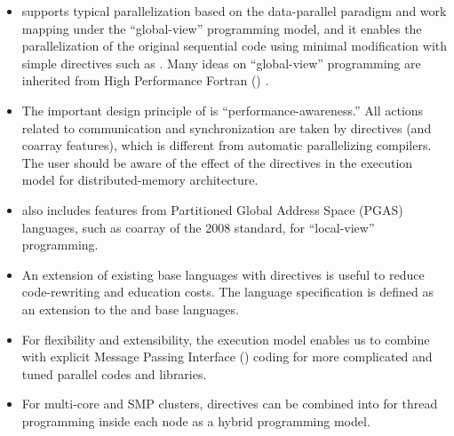 \begin{itemize}

 \item {\XMP} supports typical parallelization based on the
       data-parallel paradigm and work mapping under the ``global-view''
       programming model, and it enables the parallelization of the
       original sequential code using minimal modification with simple
       directives such as {\OMP} \cite{omp}. Many ideas on ``global-view''
       programming are inherited from High Performance Fortran ({\HPF})
       \cite{hpf}.

 \item The important design principle of {\XMP} is
       ``performance-awareness.'' All actions related to communication
       and synchronization are taken by directives (and coarray features),
       which is different from automatic parallelizing compilers. The
       user should be aware of the effect of the {\XMP} directives in
       the execution model for distributed-memory architecture.

 \item {\XMP} also includes features from Partitioned Global Address
       Space (PGAS) languages, such as coarray of the {\Fort} 2008
       standard, for ``local-view'' programming.

 \item An extension of existing base languages with directives is useful
       to reduce code-rewriting and education costs. The {\XMP} language
       specification is defined as an extension to the {\Fort} and {\C}
       base languages.

 \item For flexibility and extensibility, the execution model enables us
       to combine {\XMP} with explicit Message Passing Interface ({\MPI})
       \cite{mpi} coding for more complicated and tuned parallel codes
       and libraries.

 \item For multi-core and SMP clusters, {\OMP} directives can be
       combined into {\XMP} for thread programming inside each node as a
       hybrid programming model.


\end{itemize}
